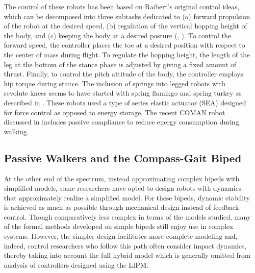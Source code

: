The control of these robots has been based on Raibert's original control ideas,
which can be decomposed into three subtasks dedicated to (a) forward propulsion
of the robot at the desired speed, (b) regulation of the vertical hopping height
of the body, and (c) keeping the body at a desired posture (\cite{Raibert1984},
\cite[Ch. 2]{Raibert1986}).
%
To control the forward speed, the controller places the toe at a desired position with respect to the center of mass during flight.
%
To regulate the hopping height, the length of the leg at the bottom of the stance phase is adjusted by giving a fixed amount of thrust.
%
Finally, to control the pitch attitude of the body, the controller employs hip torque during stance.
%
The inclusion of springs into legged robots with revolute knees seems to have started with spring flamingo and spring turkey as described in \cite{Hollerbach1992,Pratt1999,Pratt2000,Pratt2001}.
%
These robots used a type of series elastic actuator (SEA) designed for force control as opposed to energy storage. %
%
The recent COMAN robot discussed in \cite{robots_coman} includes passive compliance to reduce energy consumption during walking.


\subsection{Passive Walkers and the Compass-Gait Biped}


At the other end of the spectrum, instead approximating complex bipeds with simplified models, some researchers have opted to design robots with dynamics that approximately realize a simplified model.
%
For these bipeds, dynamic stability is achieved as much as possible through mechanical design instead of feedback control.
%
Though comparatively less complex in terms of the models studied, many of the formal methods developed on simple bipeds still enjoy use in complex systems.
%
However, the simpler design facilitates more complete modeling and, indeed, control researchers who follow this path often consider impact dynamics, thereby taking into account the full hybrid model which is generally omitted from analysis of controllers designed using the LIPM.
%

